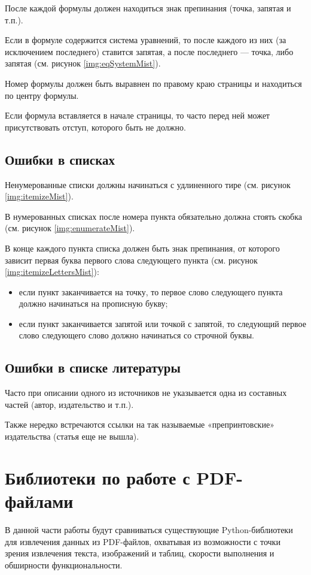 После каждой формулы должен находиться знак препинания (точка, запятая и т.п.).

Если в формуле содержится система уравнений, то после каждого из них (за исключением последнего) ставится запятая, а после последнего --- точка, либо запятая (см. рисунок \ref{img:eqSystemMist}).

Номер формулы должен быть выравнен по правому краю страницы и находиться по центру формулы.

Если формула вставляется в начале страницы, то часто перед ней может присутствовать отступ, которого быть не должно.

\subsection{Ошибки в списках}
Ненумерованные списки должны начинаться с удлиненного тире (см. рисунок \ref{img:itemizeMist}).

В нумерованных списках после номера пункта обязательно должна стоять скобка (см. рисунок \ref{img:enumerateMist}).

В конце каждого пункта списка должен быть знак препинания, от которого зависит первая буква первого слова следующего пункта (см. рисунок \ref{img:itemizeLettersMist}):
\begin{itemize}
	\item если пункт заканчивается на точку, то первое слово следующего пункта должно начинаться на прописную букву;
	\item если пункт заканчивается запятой или точкой с запятой, то следующий первое слово следующего слово должно начинаться со строчной буквы.
\end{itemize}

\subsection{Ошибки в списке литературы}
Часто при описании одного из источников не указывается одна из составных частей (автор, издательство и т.п.).

Также нередко встречаются ссылки на так называемые «препринтовские» издательства (статья еще не вышла).

\section{Библиотеки по работе с PDF-файлами}
В данной части работы будут сравниваться существующие Python-библиотеки для извлечения данных из PDF-файлов, охватывая из возможности с точки зрения извлечения текста, изображений и таблиц, скорости выполнения и обширности функциональности.
